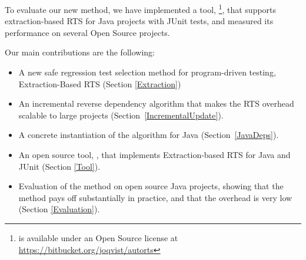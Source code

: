 {%

To evaluate our new method, we have implemented a tool, \ourtool{}\footnote{\ourtool{} is available
under an Open Source license at \url{https://bitbucket.org/joqvist/autorts}},
that supports extraction-based RTS for Java projects with JUnit tests, and  measured its performance on several Open Source projects.


Our main contributions are the following:

\begin{itemize}
  \item A new safe regression test selection method for program-driven testing, Extraction-Based RTS (Section \ref{Extraction})
  \item An incremental reverse dependency algorithm that makes the RTS overhead scalable to large projects (Section~\ref{IncrementalUpdate}).
  \item A concrete instantiation of the algorithm for Java (Section~\ref{JavaDeps}).
  \item An open source tool, \ourtool{}, that implements Ex\-trac\-tion-based RTS for Java and JUnit (Section \ref{Tool}).
  \item Evaluation of the method on open source Java projects, showing that the method pays off substantially in practice, and that the overhead is very low (Section \ref{Evaluation}).
\end{itemize}

}

